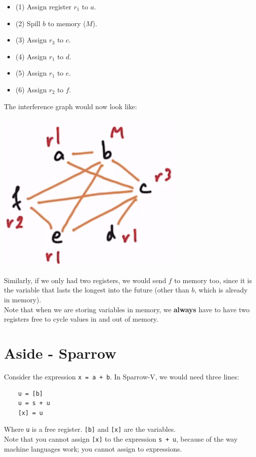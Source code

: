 \documentclass[10pt]{article}
\begin{document}
\begin{itemize}
    \item (1) Assign register $r_1$ to $a$.
    \item (2) Spill $b$ to memory ($M$).
    \item (3) Assign $r_3$ to $c$.
    \item (4) Assign $r_1$ to $d$.
    \item (5) Assign $r_1$ to $e$.
    \item (6) Assign $r_2$ to $f$.
\end{itemize}
The interference graph would now look like:
\begin{center}
    \includegraphics*[scale=0.7]{W6_2.png}    
\end{center}
Similarly, if we only had two registers, we would send $f$ to memory too, since it is the variable that lasts the longest into the future (other than $b$, which is already in memory).\\
Note that when we are storing variables in memory, we \textbf{always} have to have two registers free to cycle values in and out of memory.

\section*{Aside - Sparrow}
Consider the expression \texttt{x = a + b}.  In Sparrow-V, we would need three lines:
\begin{verbatim}
    u = [b]
    u = s + u
    [x] = u
\end{verbatim}
Where \texttt{u} is a free register.  \texttt{[b]} and \texttt{[x]} are the variables.\\
Note that you cannot assign \texttt{[x]} to the expression \texttt{s + u}, because of the way machine languages work; you cannot assign to expressions.
\end{document}

